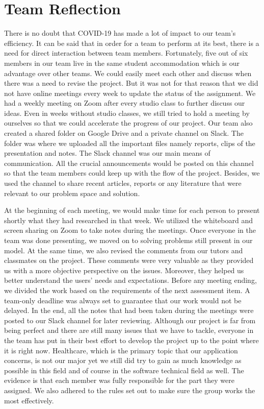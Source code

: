 \section{Team Reflection}
  \par There is no doubt that COVID-19 has made a lot of impact to our team's efficiency. It can be said that in order for a team to perform at its best, there is a need for direct interaction between team members. Fortunately, five out of six members in our team live in the same student accommodation which is our advantage over other teams. We could easily meet each other and discuss when there was a need to revise the project. But it was not for that reason that we did not have online meetings every week to update the status of the assignment. We had a weekly meeting on Zoom after every studio class to further discuss our ideas. Even in weeks without studio classes, we still tried to hold a meeting by ourselves so that we could accelerate the progress of our project. Our team also created a shared folder on Google Drive and a private channel on Slack. The folder was where we uploaded all the important files namely reports, clips of the presentation and notes. The Slack channel was our main means of communication. All the crucial announcements would be posted on this channel so that the team members could keep up with the flow of the project. Besides, we used the channel to share recent articles, reports or any literature that were relevant to our problem space and solution. 
  \par At the beginning of each meeting, we would make time for each person to present shortly what they had researched in that week. We utilized the whiteboard and screen sharing on Zoom to take notes during the meetings. Once everyone in the team was done presenting, we moved on to solving problems still present in our model. At the same time, we also revised the comments from our tutors and classmates on the project. These comments were very valuable as they provided us with a more objective perspective on the issues. Moreover, they helped us better understand the users’ needs and expectations. Before any meeting ending, we divided the work based on the requirements of the next assessment item. A team-only deadline was always set to guarantee that our work would not be delayed. In the end, all the notes that had been taken during the meetings were posted to our Slack channel for later reviewing. Although our project is far from being perfect and there are still many issues that we have to tackle, everyone in the team has put in their best effort to develop the project up to the point where it is right now. Healthcare, which is the primary topic that our application concerns, is not our major yet we still did try to gain as much knowledge as possible in this field and of course in the software technical field as well. The evidence is that each member was fully responsible for the part they were assigned. We also adhered to the rules set out to make sure the group works the most effectively.
